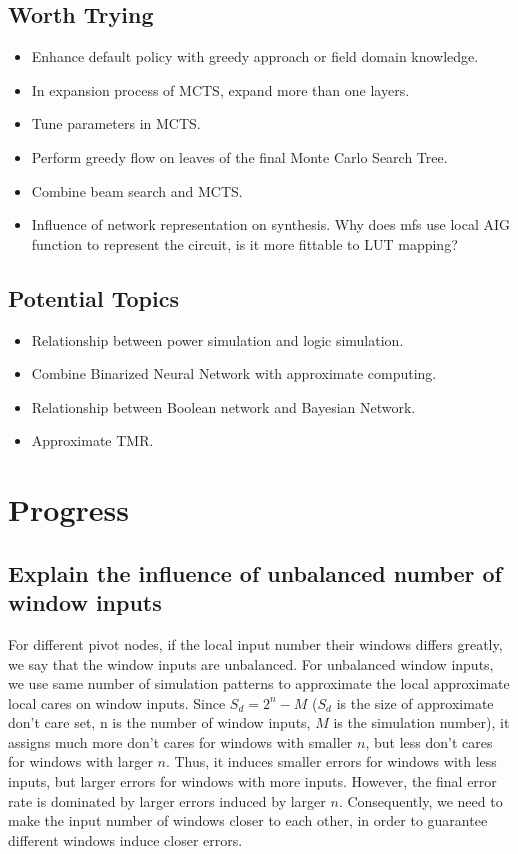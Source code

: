 \documentclass{rpt}
\begin{document}
\subsection{Worth Trying}
\begin{itemize}
    \item Enhance default policy with greedy approach or field domain knowledge.
    \item In expansion process of MCTS, expand more than one layers.
    \item Tune parameters in MCTS\@.
    \item Perform greedy flow on leaves of the final Monte Carlo Search Tree.
    \item Combine beam search and MCTS\@.
    \item
        Influence of network representation on synthesis.
        Why does mfs use local AIG function to represent the circuit,
        is it more fittable to LUT mapping?
\end{itemize}

\subsection{Potential Topics}
\begin{itemize}
    \item Relationship between power simulation and logic simulation.
    \item Combine Binarized Neural Network with approximate computing.
    \item Relationship between Boolean network and Bayesian Network.
    \item Approximate TMR\@.
\end{itemize}

\section{Progress}

\subsection{Explain the influence of unbalanced number of window inputs}
For different pivot nodes,
if the local input number their windows differs greatly,
we say that the window inputs are unbalanced.
For unbalanced window inputs,
we use same number of simulation patterns to approximate the local approximate local cares on window inputs.
Since $S_d = 2^n - M$ ($S_d$ is the size of approximate don't care set, n is the number of window inputs, $M$ is the simulation number),
it assigns much more don't cares for windows with smaller $n$,
but less don't cares for windows with larger $n$.
Thus,
it induces smaller errors for windows with less inputs,
but larger errors for windows with more inputs.
However,
the final error rate is dominated by larger errors induced by larger $n$.
Consequently,
we need to make the input number of windows closer to each other,
in order to guarantee different windows induce closer errors.
\end{document}
